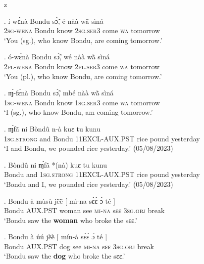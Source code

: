z   \documentclass{assets/fieldnotes}
\begin{document}
\exg. í-wɛ́nà Bondu sɔ̃̀, é nàà wã̀ sìná\\
\textsc{2sg}-\textsc{wena} Bondu know \textsc{2sg.ser3} come \textsc{wa} tomorrow\\
`You (sg.), who know Bondu, are coming tomorrow.’

\exg. ó-wɛ́nà Bondu sɔ̃̀, wé nàà wã̀ sìná\\
\textsc{2pl}-\textsc{wena} Bondu know \textsc{2pl.ser3} come \textsc{wa} tomorrow\\
`You (pl.), who know Bondu, are coming tomorrow.’

\exg. ɱ́-fɛ́nà Bondu sɔ̃̀, mbé nàà wã̀ sìná\\
\textsc{1sg}-\textsc{wena} Bondu know \textsc{1sg.ser3} come \textsc{wa} tomorrow\\
`I (sg.), who know Bondu, am coming tomorrow.’

\exg.  ɱ́fã ni Bòndû n-à kuɛ tu kunu\\
1\textsc{sg.strong} and Bondu 1\textsc{1EXCL-AUX.PST} rice pound yesterday\\
`I and Bondu, we pounded rice yesterday.' (05/08/2023)

\exg.  Bòndû ni ɱ́fã *(nà) kuɛ tu kunu\\
Bondu and 1\textsc{sg.strong} 1\textsc{1EXCL-AUX.PST} rice pound yesterday\\
`Bondu and I, we pounded rice yesterday.' (05/08/2023)






\exg. Bondu à mùsù jẽ̀ẽ̀ {[} mì-na sɛ̀ɛ̀ ɔ̀ té {]}\\
Bondu \textsc{AUX.PST} woman see {} \textsc{mi-na} sɛɛ \textsc{3sg.obj} break {}\\
`Bondu saw the \textbf{woman} who broke the sɛɛ.’

\exg. Bondu à úú jẽ̀ẽ̀ {[} mín-à sɛ̀ɛ̀ ɔ̀ té {]}\\
Bondu \textsc{AUX.PST} dog see {} \textsc{mi-na} sɛɛ \textsc{3sg.obj} break {}\\
`Bondu saw the \textbf{dog} who broke the sɛɛ.’
\end{document}
